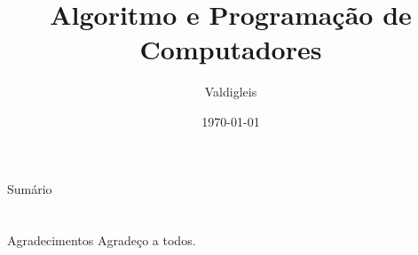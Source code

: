 \documentclass[presentation,t]{beamer}
\title[DIM0319]{Algoritmo e Programação de Computadores}
\date{\today}
\author[Valdigleis]{Valdigleis\inst{1}}
\institute[UFRN]{
	\inst{1}%
        Universidade Federal do Rio Grande do Norte\\
        Centro de Ciência Exatas e da Terra\\
        Departamento de Informática e Matemática Aplicada\\
	\url{valdigleis@dimap.ufrn.br}\\
	\vspace{0.25cm}
}
\begin{document}
\frame{\titlepage}
\section[]{}
\begin{frame}{Sumário}
	\tableofcontents
\end{frame}








\section{}
\begin{frame}{Agradecimentos}
	Agradeço a todos. 	
\end{frame}
\end{document}
